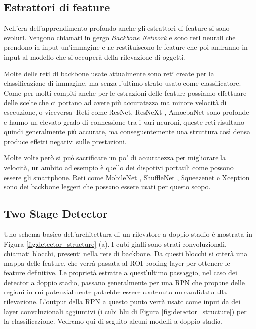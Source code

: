 \subsection{Estrattori di feature}
\label{sec:feature_extractor}
Nell'era dell'apprendimento profondo anche gli estrattori di feature si sono evoluti. Vengono chiamati in gergo \textit{Backbone Network} e sono reti neurali che prendono in input un'immagine e ne restituiscono le feature che poi andranno in input al modello che si occuperà della rilevazione di oggetti. 

Molte delle reti di backbone usate attualmente sono reti create per la classificazione di immagine, ma senza l'ultimo strato usato come classificatore. Come per molti compiti anche per le estrazioni delle feature possiamo effettuare delle scelte che ci portano ad avere più accuratezza ma minore velocità di esecuzione, o viceversa. 
Reti come ResNet\cite{viola2004robust}, ResNeXt \cite{he2015spatial}, AmoebaNet \cite{girshick2015fast} sono profonde e hanno un elevato grado di connessione tra i vari neuroni, queste reti risultano quindi generalmente più accurate, ma conseguentemente una struttura così densa produce effetti negativi sulle prestazioni. 

Molte volte però si può sacrificare un po' di accuratezza per migliorare la velocità, un ambito ad esempio è quello dei dispotivi portatili come possono essere gli smartphone. Reti come MobileNet \cite{ren2015faster}, ShuffleNet \cite{redmon2016you}, Squeezenet \cite{liu2016ssd} o Xception \cite{lin2017feature} sono dei backbone leggeri che possono essere usati per questo scopo. 

\subsection{Two Stage Detector}
\label{subsec:two_stage_detector}
Uno schema basico dell'architettura di un rilevatore a doppio stadio è mostrata in Figura \ref{fig:detector_structure} (a). I cubi gialli sono strati convoluzionali, chiamati blocchi, presenti nella rete di backbone. Da questi blocchi si otterà una mappa delle feature, che verrà passata al \ac{ROI} pooling layer per ottenere le feature definitive. 
Le proprietà estratte a quest'ultimo passaggio, nel caso dei detector a doppio stadio, passano generalmente per una \ac{RPN} che propone delle regioni in cui potenzialmente potrebbe essere contenuto un candidato alla rilevazione. L'output della \ac{RPN} a questo punto verrà usato come input da dei layer convoluzionali aggiuntivi (i cubi blu di Figura \ref{fig:detector_structure}) per la classificazione.
Vedremo qui di seguito alcuni modelli a doppio stadio. 
